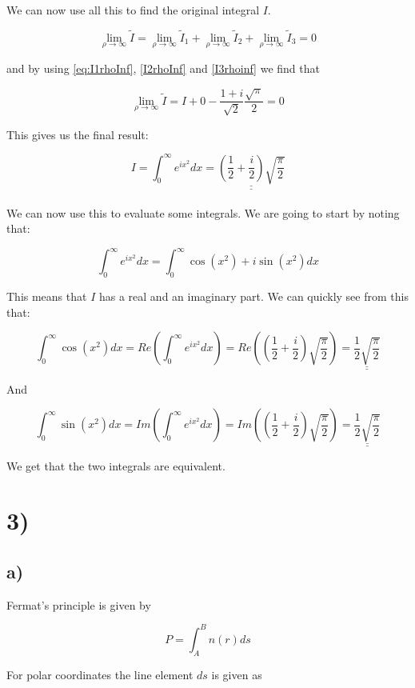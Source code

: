 \documentclass[a4paper,norsk, 10pt]{article}
\begin{document}
We can now use all this to find the original integral $I$.

$$
\lim_{\rho \rightarrow \infty} \tilde{I} = \lim_{\rho \rightarrow \infty} \tilde{I}_1 + \lim_{\rho \rightarrow \infty} \tilde{I}_2 + \lim_{\rho \rightarrow \infty} \tilde{I}_3 = 0
$$

and by using \ref{eq:I1rhoInf}, \ref{I2rhoInf} and \ref{I3rhoinf} we find that

$$
\lim_{\rho \rightarrow \infty} \tilde{I} = I + 0 - \frac{1+i}{\sqrt{2}} \frac{\sqrt{\pi}}{2} = 0
$$

This gives us the final result:

$$
I = \int_0^{\infty}e^{ix^2}dx =\underline{\underline{\left(\frac{1}{2} +\frac{i}{2}\right) \sqrt{\frac{\pi}{2}}}}
$$\\

We can now use this to evaluate some integrals. We are going to start by noting that:

$$
\int_0^{\infty}e^{ix^2}dx = \int_0^{\infty} \cos(x^2) + i\sin(x^2)dx
$$

This means that $I$ has a real and an imaginary part. We can quickly see from this that:

$$
\int_0^{\infty} \cos(x^2)dx = Re(\int_0^{\infty}e^{ix^2}dx) = Re\left(\left(\frac{1}{2} +\frac{i}{2}\right) \sqrt{\frac{\pi}{2}}\right) = \underline{\underline{\frac{1}{2}\sqrt{\frac{\pi}{2}}}}
$$

And

$$
\int_0^{\infty} \sin(x^2)dx = Im(\int_0^{\infty}e^{ix^2}dx) = Im\left(\left(\frac{1}{2} +\frac{i}{2}\right) \sqrt{\frac{\pi}{2}}\right) = \underline{\underline{\frac{1}{2}\sqrt{\frac{\pi}{2}}}}
$$

We get that the two integrals are equivalent. 


\newpage
\section*{3)}
\subsection*{a)}

Fermat's principle is given by

\begin{equation}
P = \int_A^B n(r) ds
\end{equation}

For polar coordinates the line element $ds$ is given as 
\end{document}
